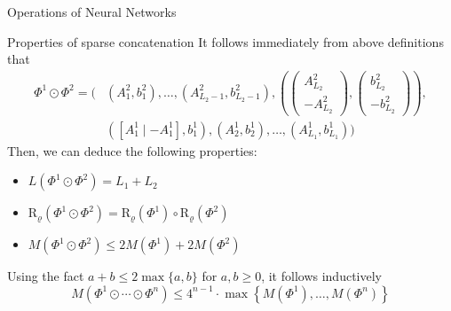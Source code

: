 \documentclass{if-beamer}
\begin{document}
\begin{frame}{Operations of Neural Networks}
    \begin{block}{Properties of sparse concatenation}
        It follows immediately from above definitions that 
        {\small
        \begin{align*}
            \Phi^{1} \odot \Phi^{2}=\Big(&\left(A_{1}^{2}, b_{1}^{2}\right), \ldots,\left(A_{L_{2}-1}^{2}, b_{L_{2}-1}^{2}\right),\left(\left(\begin{array}{c}
            A_{L_{2}}^{2} \\
            -A_{L_{2}}^{2} \end{array}\right),\left(\begin{array}{c}
            b_{L_{2}}^{2} \\
            -b_{L_{2}}^{2}
            \end{array}\right)\right),\\
            &\left(\left[A_{1}^{1} \mid-A_{1}^{1}\right], b_{1}^{1}\right),\left(A_{2}^{1}, b_{2}^{1}\right), \ldots,\left(A_{L_{1}}^{1}, b_{L_{1}}^{1}\right)\Big)
        \end{align*}
        }
        Then, we can deduce the following properties:
        \begin{itemize}
            \item $L(\Phi^{1} \odot \Phi^{2}) = L_1 + L_2$
            \item $\mathrm{R}_{\varrho}\left(\Phi^{1} \odot \Phi^{2}\right)=\mathrm{R}_{\varrho}\left(\Phi^{1}\right) \circ \mathrm{R}_{\varrho}\left(\Phi^{2}\right)$
            \item $M\left(\Phi^{1} \odot \Phi^{2}\right) \leq 2 M\left(\Phi^{1}\right)+2 M\left(\Phi^{2}\right)$
        \end{itemize}
        Using the fact $ a+b \leq 2 \max \{a, b\}$ for $a, b \geq 0$, it follows inductively
        \[
        M\left(\Phi^{1} \odot \cdots \odot \Phi^{n}\right) \leq 4^{n-1} \cdot \max \left\{M\left(\Phi^{1}\right), \ldots, M\left(\Phi^{n}\right)\right\}
        \]
    \end{block}
\end{frame}
\end{document}
